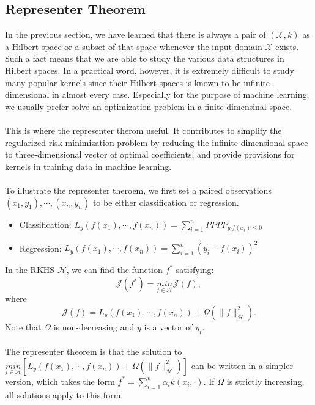 \subsection{Representer Theorem}
In the previous section, we have learned that there is always a pair of $(\mathcal{X},k)$ as a Hilbert space or a subset of that space whenever the input domain $\mathcal{X}$ exists. Such a fact means that we are able to study the various data structures in Hilbert spaces. 
In a practical word, however, it is extremely difficult to study many popular kernels since their Hilbert spaces is known to be infinite-dimensional in almost every case. Especially for the purpose of machine learning, we usually prefer solve an optimization problem in a finite-dimensinal space. 
\\ \\
This is where the representer therom useful. It contributes to simplify the regularized risk-minimization problem by reducing the infinite-dimensional space to three-dimensional vector of optimal coefficients, and provide provisions for kernels in training data in machine learning.
\\ \\
To illustrate the representer theroem, we first set a paired observations $(x_1,y_1),\cdots,(x_n,y_n)$ to be either classification or regression. 
\begin{itemize}
    \item Classification: $L_y(f(x_1),\cdots,f(x_n))=\sum_{i=1}^nPPPP_{y_if(x_i)\leq0}$
    \item Regression: $L_y(f(x_1),\cdots,f(x_n))=\sum_{i=1}^n(y_i-f(x_i))^2$
\end{itemize}
In the RKHS $\mathcal{H}$, we can find the function $f^*$ satisfying:
\begin{equation}
    \mathcal{J}(f^*)=\underset{f\in\mathcal{H}}{min}\mathcal{J}(f),
\end{equation}
where 
\begin{equation*}
    \mathcal{J}(f)=L_y(f(x_1),\cdots,f(x_n))+\Omega(\parallel f \parallel_\mathcal{H}^2).
\end{equation*}
Note that $\Omega$ is non-decreasing and $y$ is a vector of $y_i$. 
\\ \\
The representer theorem is that the solution to $\underset{f\in\mathcal{H}}{min}[L_y(f(x_1),\cdots,f(x_n))+\Omega(\parallel f \parallel_\mathcal{H}^2)]$ can 
be written in a simpler version, which takes the form $f^*=\sum_{i=1}^n\alpha_i k(x_i,\cdot)$. If $\Omega$ is strictly increasing, all solutions apply to this form.

